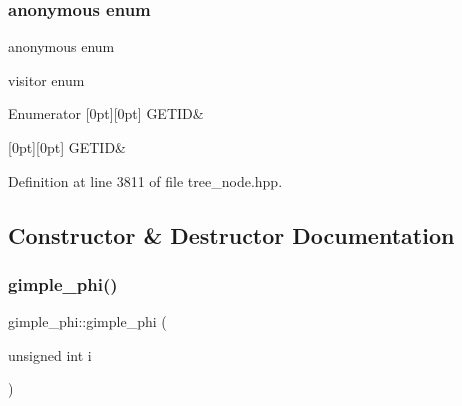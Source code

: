 \subsubsection{\texorpdfstring{anonymous enum}{anonymous enum}}
{\footnotesize\ttfamily anonymous enum}



visitor enum 

\begin{DoxyEnumFields}{Enumerator}
[0pt][0pt]{}\mbox{\label{structgimple__phi_a372f157945dd4358f30d58eda2f09ac9a0894a0df2a278d07a0998cf30c005525}} 
G\+E\+T\+ID&\\
\hline

[0pt][0pt]{}\mbox{\label{structgimple__phi_a372f157945dd4358f30d58eda2f09ac9a0894a0df2a278d07a0998cf30c005525}} 
G\+E\+T\+ID&\\
\hline

\end{DoxyEnumFields}


Definition at line 3811 of file tree\+\_\+node.\+hpp.



\subsection{Constructor \& Destructor Documentation}
\mbox{\label{structgimple__phi_a7c183fbc4a262b0f3496fea6c020b6fd}} 
\subsubsection{\texorpdfstring{gimple\+\_\+phi()}{gimple\_phi()}}
{\footnotesize\ttfamily gimple\+\_\+phi\+::gimple\+\_\+phi (\begin{DoxyParamCaption}\item[{unsigned int}]{i }\end{DoxyParamCaption})\hspace{0.3cm}{\ttfamily [explicit]}}



